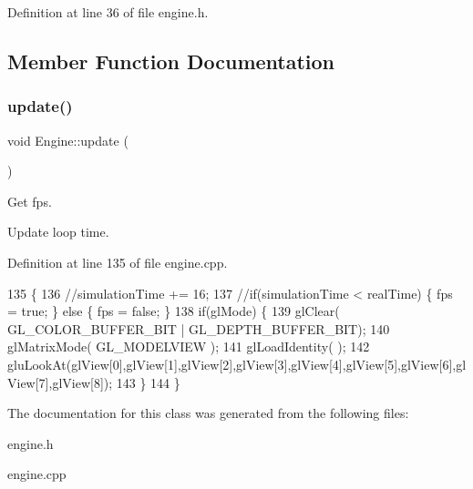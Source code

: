 Definition at line 36 of file engine.\+h.



\subsection{Member Function Documentation}
\mbox{\label{classEngine_ad2ff110d5a86c1cd60b541d65915ac48}} 
\subsubsection{\texorpdfstring{update()}{update()}}
{\footnotesize\ttfamily void Engine\+::update (\begin{DoxyParamCaption}{ }\end{DoxyParamCaption})}



Get fps. 

Update loop time. 

Definition at line 135 of file engine.\+cpp.


\begin{DoxyCode}
135                     \{
136   \textcolor{comment}{//simulationTime += 16;}
137   \textcolor{comment}{//if(simulationTime < realTime) \{ fps = true; \} else \{ fps = false; \}}
138   \textcolor{keywordflow}{if}(glMode) \{
139    glClear( GL\_COLOR\_BUFFER\_BIT | GL\_DEPTH\_BUFFER\_BIT);
140    glMatrixMode( GL\_MODELVIEW );
141    glLoadIdentity( );
142    gluLookAt(glView[0],glView[1],glView[2],glView[3],glView[4],glView[5],glView[6],glView[7],glView[8]);
143   \}
144 \}
\end{DoxyCode}


The documentation for this class was generated from the following files\+:\begin{DoxyCompactItemize}
\item 
engine.\+h\item 
engine.\+cpp\end{DoxyCompactItemize}
